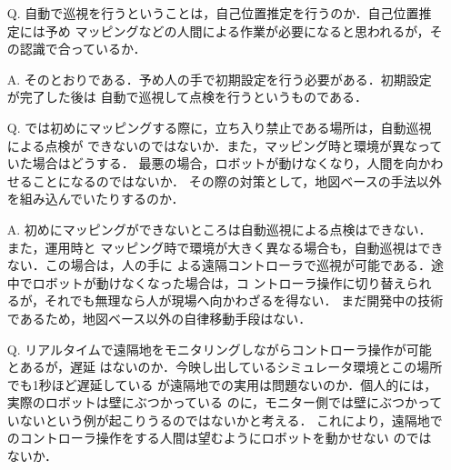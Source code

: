 \documentclass{jsarticle}
\begin{document}
\begin{itemize}
  \addtolength{\itemindent}{5.4zw}
  \item [Q.]自動で巡視を行うということは，自己位置推定を行うのか．自己位置推定には予め
  \hspace*{5.5zw}マッピングなどの人間による作業が必要になると思われるが，その認識で合っているか．
  \vspace*{1zh}

  \item [A.]そのとおりである．予め人の手で初期設定を行う必要がある．初期設定が完了した後は
  \hspace*{5.5zw}自動で巡視して点検を行うというものである．\\
  \vspace*{1zh}

  \item [Q.]では初めにマッピングする際に，立ち入り禁止である場所は，自動巡視による点検が
  \hspace*{5.5zw}できないのではないか．また，マッピング時と環境が異なっていた場合はどうする．
  \hspace*{5.5zw}最悪の場合，ロボットが動けなくなり，人間を向かわせることになるのではないか．
  \hspace*{5.5zw}その際の対策として，地図ベースの手法以外を組み込んでいたりするのか．
  \vspace*{1zh}

  \item [A.]初めにマッピングができないところは自動巡視による点検はできない．また，運用時と
  \hspace*{5.5zw}マッピング時で環境が大きく異なる場合も，自動巡視はできない．この場合は，人の手に
  \hspace*{5.5zw}よる遠隔コントローラで巡視が可能である．途中でロボットが動けなくなった場合は，コ
  \hspace*{5.5zw}ントローラ操作に切り替えられるが，それでも無理なら人が現場へ向かわざるを得ない．
  \hspace*{5.5zw}まだ開発中の技術であるため，地図ベース以外の自律移動手段はない．\\
  
  \newpage

  \vspace*{-10zh}

  \item [Q.]リアルタイムで遠隔地をモニタリングしながらコントローラ操作が可能とあるが，遅延
  \hspace*{5.5zw}はないのか．今映し出しているシミュレータ環境とこの場所でも1秒ほど遅延している
  \hspace*{5.5zw}が遠隔地での実用は問題ないのか．個人的には，実際のロボットは壁にぶつかっている
  \hspace*{5.5zw}のに，モニター側では壁にぶつかっていないという例が起こりうるのではないかと考える．
  \hspace*{5.5zw}これにより，遠隔地でのコントローラ操作をする人間は望むようにロボットを動かせない
  \hspace*{5.5zw}のではないか．
  \vspace*{1zh}


\end{itemize}
\end{document}
